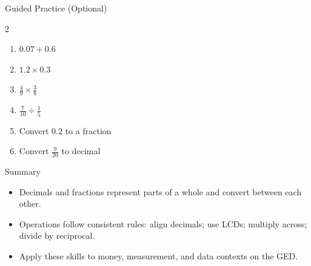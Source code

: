 \documentclass[aspectratio=169]{beamer}
\begin{document}
\begin{frame}{Guided Practice (Optional)}
\begin{multicols}{2}
\begin{enumerate}
  \item $0.07+0.6$
  \item $1.2\times0.3$
  \item $\frac{4}{9}\times\frac{3}{8}$
  \item $\frac{7}{10}\div\frac{1}{5}$
  \item Convert $0.2$ to a fraction
  \item Convert $\frac{9}{20}$ to decimal
\end{enumerate}
\end{multicols}
\end{frame}

\begin{frame}{Summary}
\begin{itemize}
  \item Decimals and fractions represent parts of a whole and convert between each other.
  \item Operations follow consistent rules: align decimals; use LCDs; multiply across; divide by reciprocal.
  \item Apply these skills to money, measurement, and data contexts on the GED.
\end{itemize}
\end{frame}
\end{document}
